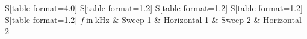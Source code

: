 \begin{table}
    \centering
    \caption{Position der ersten und zweiten Resonanzstelle für verschiedene Frequenzen }
    \label{tab:Messwerte}
    \begin{tabular}{
	S[table-format=4.0]
	S[table-format=1.2]
	S[table-format=1.2]
	S[table-format=1.2]
	S[table-format=1.2]
	}
	\toprule
	{$f \ \mathrm{in} \ \si{\kilo\hertz}$}		& {Sweep 1}		& 
	{Horizontal 1}		& {Sweep 2}		& 
	{Horizontal 2}		\\ 
	\midrule
    
    \bottomrule
    \end{tabular}
    \end{table}
